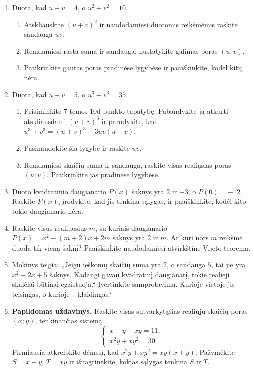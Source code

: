 \documentclass[12pt,a4paper]{article}
\begin{document}
\begin{enumerate}[series=uzdaviniai]
\begin{enumerate}
\item Tarkime, kad šis daugianaris turi dvi skirtingas realiąsias šaknis $r$ ir $s$. Kodėl abi poros $(r;s)$ ir $(s;r)$ tenkina sistemą ir kitų porų nėra? Kurią teoremą naudojate šioje dalyje?
\item Kiek sprendinių porų yra, kai $S^2-4T>0$, kai $S^2-4T=0$ ir kai $S^2-4T<0$? Paaiškinkite.
\end{enumerate}
\par\medskip
\textbf{Sustokite ir apibendrinkite.} Kaip skaičių sumos ir sandaugos sistema susijusi su redukuotąja lygtimi? Kodėl reikia tikrinti ir porų tvarką?
\item Duota, kad $u+v=4$, o $u^2+v^2=10$.
\begin{enumerate}
\item Atskliauskite $(u+v)^2$ ir naudodamiesi duotomis reikšmėmis raskite sandaugą $uv$.
\item Remdamiesi rasta suma ir sandauga, nustatykite galimas poras $(u;v)$.
\item Patikrinkite gautas poras pradinėse lygybėse ir paaiškinkite, kodėl kitų nėra.
\end{enumerate}
\item Duota, kad $u+v=5$, o $u^3+v^3=35$.
\begin{enumerate}
\item Prisiminkite 7 temos 10d punkto tapatybę. Pabandykite ją atkurti atskliausdami $(u+v)^3$ ir parodykite, kad $u^3+v^3=(u+v)^3-3uv(u+v)$.
\item Pasinaudokite šia lygybe ir raskite $uv$.
\item Remdamiesi skaičių suma ir sandauga, raskite visas realiąsias poras $(u;v)$. Patikrinkite jas pradinėse lygybėse.
\end{enumerate}
\item Duoto kvadratinio daugianario $P(x)$ šaknys yra $2$ ir $-3$, o $P(0)=-12$. Raskite $P(x)$, įrodykite, kad jis tenkina sąlygas, ir paaiškinkite, kodėl kito tokio daugianario nėra.
\item Raskite visus realiuosius $m$, su kuriais daugianario $P(x)=x^2-(m+2)x+2m$ šaknys yra $2$ ir $m$. Ar kuri nors $m$ reikšmė duoda tik vieną šaknį? Paaiškinkite naudodamiesi atvirkštine Vijeto teorema.
\item Mokinys teigia: „Jeigu ieškomų skaičių suma yra $2$, o sandauga $5$, tai jie yra $x^2-2x+5$ šaknys. Kadangi gavau kvadratinį daugianarį, tokie realieji skaičiai būtinai egzistuoja.“ Įvertinkite samprotavimą. Kurioje vietoje jis teisingas, o kurioje – klaidingas?
\item \textbf{Papildomas uždavinys.} Raskite visas sutvarkytąsias realiųjų skaičių poras $(x;y)$, tenkinančias sistemą
\[\begin{cases}x+y+xy=11,\\x^2y+xy^2=30.\end{cases}\]
Pirmiausia atkreipkite dėmesį, kad $x^2y+xy^2=xy(x+y)$. Pažymėkite $S=x+y$, $T=xy$ ir išnagrinėkite, kokias sąlygas tenkina $S$ ir $T$.
\end{enumerate}
\end{document}
